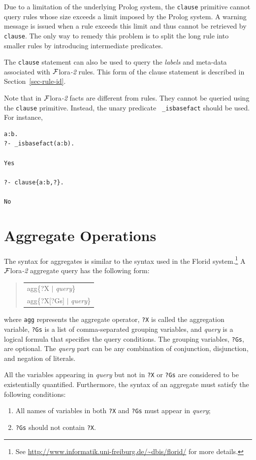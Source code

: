 \documentclass[11pt]{article}
\newenvironment{qrules}{\begin{quote}\tt\begin{tabular}[t]{l}}%
{\end{tabular}\end{quote}}
\newcommand{\FLORA}{{\mbox{\sc ${\cal F}${lora}\rm\emph{-2}}}\xspace}
\newcommand{\FLORID}{{\mbox{\sc Florid}}\xspace}
\begin{document}
Due to a limitation of the underlying Prolog system, the {\tt clause}
primitive cannot query rules whose size exceeds a limit imposed by the
Prolog system.  A warning message is issued when a rule exceeds this limit
and thus cannot be retrieved by {\tt clause}.  The only way to remedy this
problem is to split the long rule into smaller rules by introducing
intermediate predicates.

The {\tt clause} statement can also be used to query the \emph{labels} and
meta-data associated with \FLORA rules. This form of the clause statement
is described in Section~\ref{sec-rule-id}.

Note that in \FLORA facts are different from rules. They cannot be queried
using the {\tt clause} primitive. Instead, the unary predicate {\tt
  \_isbasefact} should be used. For instance,
\begin{verbatim}
a:b.
?- _isbasefact(a:b).

Yes

?- clause{a:b,?}.

No
\end{verbatim}


\section{Aggregate Operations}
\label{sec-aggregates}


The syntax for aggregates is similar to the syntax used in the \FLORID
system.\footnote{
  See \url{http://www.informatik.uni-freiburg.de/~dbis/florid/} for more
  details.
}
A \FLORA aggregate query has the following form:
\begin{qrules}
agg\{?X $|$ {\it query}\}\\
agg\{?X[?Gs] $|$ {\it query}\}
\end{qrules}
%
where {\tt agg} represents the aggregate operator, {\tt ?X} is called the
aggregation variable, {\tt ?Gs} is a list of comma-separated grouping
variables, and {\it query} is a logical formula that specifies the
query conditions. The grouping variables, {\tt ?Gs}, are optional. The {\it
query} part
can be any combination of conjunction, disjunction, and negation of literals.

All the variables appearing in {\it query} but not in {\tt ?X} or {\tt ?Gs} are
considered to be existentially quantified. Furthermore, the syntax of an
aggregate must satisfy the following conditions:
\begin{enumerate}
\item All names of variables in both {\tt ?X} and {\tt ?Gs} must
appear in {\it query};
\item {\tt ?Gs} should not contain {\tt ?X}.
\end{enumerate}
\end{document}
